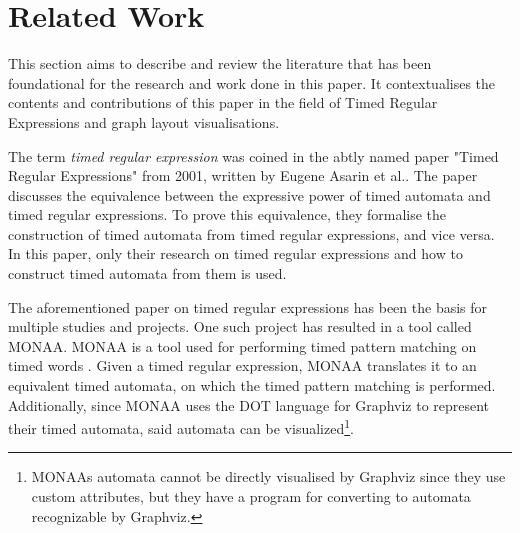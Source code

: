 \section{Related Work}



This section aims to describe and review the literature that has been foundational for the research and work done in this paper. It contextualises the contents and contributions of this paper in the field of Timed Regular Expressions and graph layout visualisations.

The term \textit{timed regular expression} was coined in the abtly named paper "Timed Regular Expressions" from 2001, written by Eugene Asarin et al.\cite{Eugene2001}. The paper discusses the equivalence between the expressive power of timed automata and timed regular expressions. To prove this equivalence, they formalise the construction of timed automata from timed regular expressions, and vice versa. In this paper, only their research on timed regular expressions and how to construct timed automata from them is used.

The aforementioned paper on timed regular expressions has been the basis for multiple studies and projects. One such project has resulted in a tool called MONAA. MONAA is a tool used for performing timed pattern matching on timed words \cite{MONAA2017}. Given a timed regular expression, MONAA translates it to an equivalent timed automata, on which the timed pattern matching is performed. Additionally, since MONAA uses the DOT language for Graphviz \cite{Graphviz} to represent their timed automata, said automata can be visualized\footnote{MONAAs automata cannot be directly visualised by Graphviz since they use custom attributes, but they have a program for converting to automata recognizable by Graphviz\cite{MONAA2017}.}.
